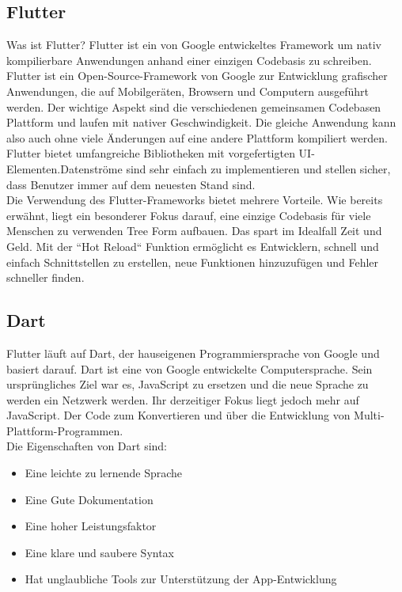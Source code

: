 \subsection{Flutter}
Was ist Flutter? Flutter ist ein von Google entwickeltes Framework um nativ kompilierbare Anwendungen anhand einer einzigen Codebasis zu schreiben.
Flutter ist ein Open-Source-Framework von Google zur Entwicklung grafischer Anwendungen, die auf Mobilgeräten, Browsern und Computern ausgeführt werden. Der wichtige Aspekt sind die verschiedenen gemeinsamen Codebasen
Plattform und laufen mit nativer Geschwindigkeit. Die gleiche Anwendung kann also auch ohne viele Änderungen auf eine andere Plattform kompiliert werden. Flutter bietet umfangreiche Bibliotheken mit vorgefertigten UI-Elementen.Datenströme sind sehr einfach zu implementieren und stellen sicher, dass Benutzer immer auf dem neuesten Stand sind.\\
Die Verwendung des Flutter-Frameworks bietet mehrere Vorteile. Wie bereits erwähnt, liegt ein besonderer Fokus darauf, eine einzige Codebasis für viele Menschen zu verwenden Tree Form aufbauen. Das spart im Idealfall Zeit und Geld. Mit der “Hot Reload“ Funktion ermöglicht es Entwicklern, schnell und einfach Schnittstellen zu erstellen, neue Funktionen hinzuzufügen und  
Fehler schneller finden\cite{Flut}.
\subsection{Dart}
Flutter läuft auf Dart, der hauseigenen Programmiersprache von Google und basiert darauf.
Dart ist eine von Google entwickelte Computersprache. Sein ursprüngliches Ziel war es, JavaScript zu ersetzen und die neue Sprache zu werden
ein Netzwerk werden. Ihr derzeitiger Fokus liegt jedoch mehr auf JavaScript.
Der Code zum Konvertieren und über die Entwicklung von Multi-Plattform-Programmen.\\
Die Eigenschaften von Dart sind:
\begin{itemize}
\item Eine leichte zu lernende Sprache
\item Eine Gute Dokumentation
\item Eine hoher Leistungsfaktor
\item Eine klare und saubere Syntax
\item Hat unglaubliche Tools zur Unterstützung der App-Entwicklung
\end{itemize}
